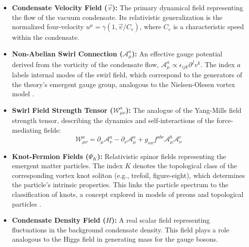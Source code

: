 \documentclass[a4paper,12pt]{article}
\begin{document}
    \begin{itemize}
        \item \textbf{Condensate Velocity Field ($\vec{v}$):} The primary dynamical field representing the flow of the vacuum condensate. Its relativistic generalization is the normalized four-velocity $u^\mu = \gamma(1, \vec{v}/C_e)$, where $C_e$ is a characteristic speed within the condensate.

        \item \textbf{Non-Abelian Swirl Connection ($\mathcal{A}_\mu^a$):} An effective gauge potential derived from the vorticity of the condensate flow, $\mathcal{A}_\mu^a \propto \epsilon_{ijk} \partial^j v^k$. The index $a$ labels internal modes of the swirl field, which correspond to the generators of the theory's emergent gauge group, analogous to the Nielsen-Olesen vortex model \cite{Nielsen1973}.

        \item \textbf{Swirl Field Strength Tensor ($\mathcal{W}_{\mu\nu}^a$):} The analogue of the Yang-Mills field strength tensor, describing the dynamics and self-interactions of the force-mediating fields:
        \begin{equation}
            \mathcal{W}_{\mu\nu}^a = \partial_\mu \mathcal{A}_\nu^a - \partial_\nu \mathcal{A}_\mu^a + g_{sw} f^{abc} \mathcal{A}_\mu^b \mathcal{A}_\nu^c
        \end{equation}

        \item \textbf{Knot-Fermion Fields ($\Psi_K$):} Relativistic spinor fields representing the emergent matter particles. The index $K$ denotes the topological class of the corresponding vortex knot soliton (e.g., trefoil, figure-eight), which determines the particle's intrinsic properties. This links the particle spectrum to the classification of knots, a concept explored in models of preons and topological particles \cite{BilsonThompson2007}.

        \item \textbf{Condensate Density Field ($H$):} A real scalar field representing fluctuations in the background condensate density. This field plays a role analogous to the Higgs field in generating mass for the gauge bosons.
    \end{itemize}

\end{document}
